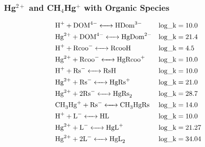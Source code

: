 \documentclass[12pt, a4paper]{article}
\begin{document}
\subsubsection{Hg$^{2+}$ and CH$_4$Hg$^{+}$ with Organic Species}

\begin{align}
& \ce{H+ + DOM^4- <-> HDom^3-} && \mathrm{log\_k} = 10.0 \\
& \ce{Hg^2+ + DOM^4- <-> HgDom^2-} && \mathrm{log\_k} = 21.4 \\
& \ce{H+ + Rcoo^- <-> RcooH} && \mathrm{log\_k} = 4.5 \\
& \ce{Hg^2+ + Rcoo^- <-> HgRcoo^+} && \mathrm{log\_k} = 10.0 \\
& \ce{H+ + Rs^- <-> RsH} && \mathrm{log\_k} = 10.0 \\
& \ce{Hg^2+ + Rs^- <-> HgRs^+} && \mathrm{log\_k} = 21.0 \\
& \ce{Hg^2+ + 2 Rs^- <-> HgRs_2} && \mathrm{log\_k} = 28.7 \\
& \ce{CH_3Hg+ + Rs^- <-> CH_3HgRs} && \mathrm{log\_k} = 14.0 \\
& \ce{H+ + L^- <-> HL} && \mathrm{log\_k} = 10.0 \\
& \ce{Hg^2+ + L^- <-> HgL^+} && \mathrm{log\_k} = 21.27 \\
& \ce{Hg^2+ + 2 L^- <-> HgL_2} && \mathrm{log\_k} = 34.04 \\

\end{align}
\end{document}
